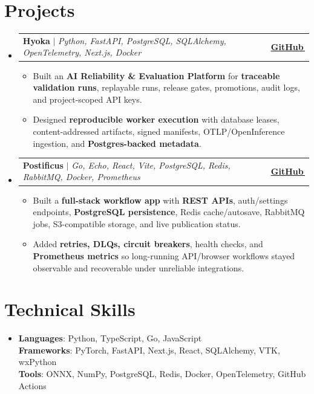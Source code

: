 \documentclass[letterpaper,11pt]{article}
\makeatletter
\newcommand{\bodyhref}[2]{\href{#1}{\underline{#2}\,\faExternalLink*}}
\newcommand{\resumeItem}[1]{\item{\fontsize{10.2pt}{11.5pt}\selectfont #1\vspace{-0.1pt}}}
\newcommand{\resumeProjectHeading}[2]{
    \item
    \begin{tabular*}{1.001\textwidth}{l@{\extracolsep{\fill}}r}
      \small#1 & \textbf{\small #2}\\
    \end{tabular*}\vspace{-3pt}
}
\newcommand{\resumeSubHeadingListStart}{\begin{itemize}[leftmargin=0.0in, label={}, itemsep=1.5pt, topsep=0pt, parsep=0pt, partopsep=0pt]}
\newcommand{\resumeSubHeadingListEnd}{\end{itemize}}
\newcommand{\resumeItemListStart}{\begin{itemize}[leftmargin=0.16in,itemsep=1.0pt,topsep=2.0pt,parsep=0pt,partopsep=0pt]}
\newcommand{\resumeItemListEnd}{\end{itemize}\vspace{-1pt}}
\makeatother
\begin{document}
\section{Projects}
\resumeSubHeadingListStart
\resumeProjectHeading
{\textbf{Hyoka} $|$ \emph{Python, FastAPI, PostgreSQL, SQLAlchemy, OpenTelemetry, Next.js, Docker}}{\bodyhref{https://github.com/unichronic/hyoka}{GitHub}}
\resumeItemListStart
\resumeItem{Built an \textbf{AI Reliability \& Evaluation Platform} for \textbf{traceable validation runs}, replayable runs, release gates, promotions, audit logs, and project-scoped API keys.}
\resumeItem{Designed \textbf{reproducible worker execution} with database leases, content-addressed artifacts, signed manifests, OTLP/OpenInference ingestion, and \textbf{Postgres-backed metadata}.}
\resumeItemListEnd
\resumeProjectHeading
{\textbf{Postificus} $|$ \emph{Go, Echo, React, Vite, PostgreSQL, Redis, RabbitMQ, Docker, Prometheus}}{\bodyhref{https://github.com/unichronic/postificus}{GitHub}}
\resumeItemListStart
\resumeItem{Built a \textbf{full-stack workflow app} with \textbf{REST APIs}, auth/settings endpoints, \textbf{PostgreSQL persistence}, Redis cache/autosave, RabbitMQ jobs, S3-compatible storage, and live publication status.}
\resumeItem{Added \textbf{retries, DLQs, circuit breakers}, health checks, and \textbf{Prometheus metrics} so long-running API/browser workflows stayed observable and recoverable under unreliable integrations.}
\resumeItemListEnd
\resumeSubHeadingListEnd

\section{Technical Skills}
\begin{itemize}[leftmargin=0.15in, label={}, topsep=0pt, itemsep=0pt, parsep=0pt, partopsep=0pt]
  \item{\fontsize{9.6pt}{10.0pt}\selectfont
   \textbf{Languages}{: Python, TypeScript, Go, JavaScript} \\
   \textbf{Frameworks}{: PyTorch, FastAPI, Next.js, React, SQLAlchemy, VTK, wxPython} \\
   \textbf{Tools}{: ONNX, NumPy, PostgreSQL, Redis, Docker, OpenTelemetry, GitHub Actions} \\
  }
\end{itemize}
\end{document}
